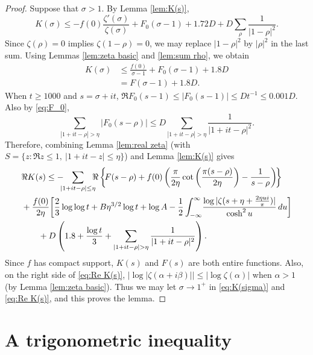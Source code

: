 \documentclass[10pt]{amsart}
\theoremstyle{remark}
\theoremstyle{plain}
\numberwithin{equation}{section}
\theoremstyle{definition}
\def\({\left(}
\def\){\right)}
\def\pfrac#1#2{\left(\frac{#1}{#2}\right)}
\def\nts{\negthickspace}
\begin{document}
\begin{proof} Suppose that $\sigma>1$.  By Lemma \ref{lem:K(s)},
$$
K(\sigma) \le -f(0) \frac{\zeta'(\sigma)}{\zeta(\sigma)} + 
F_0(\sigma-1) + 1.72D + D\sum_{\rho} \frac{1}{|1-\rho|^2}.
$$
Since $\zeta(\rho)=0$ implies $\zeta(1-\rho)=0$, we may replace $|1-\rho|^2$
by $|\rho|^2$ in the last sum.  Using Lemmas \ref{lem:zeta basic} and 
\ref{lem:sum rho}, we obtain
\begin{equation}
\begin{split}
K(\sigma) &\le \frac{f(0)}{\sigma-1} + F_0(\sigma-1)+1.8D \\
&=F(\sigma-1)+1.8D. 
\end{split}
\label{eq:K(sigma)} 
\end{equation}
When $t\ge 1000$ and $s=\sigma+it$,
$\Re F_0(s-1) \le |F_0(s-1)| \le Dt^{-1} \le 0.001 D$.
Also by \eqref{eq:F_0},
$$
\sum_{|1+it-\rho|>\eta} |F_0(s-\rho)| \le D \sum_{|1+it-\rho|>\eta}
\frac{1}{|1+it-\rho|^2}.
$$
Therefore, combining Lemma \ref{lem:real zeta} (with $S=\{ z: \Re z\le 1,\
 |1+it-z|\le \eta\}$) and Lemma \ref{lem:K(s)} gives
\begin{equation}
\begin{split}
&\Re K(s) \le  -\nts\nts \sum_{|1+it-\rho| \le \eta}\nts\nts \Re \left\{\!
   F(s-\rho) + f(0) \( \frac{\pi}{2\eta} \cot\pfrac{\pi(s-\rho)}{2\eta}
   -\frac{1}{s-\rho} \)\! \right\}  \\
&+ \frac{f(0)}{2\eta} \biggl[\frac23 \log\log t + B \eta^{3/2} \log t+\log A
  - \frac12 \int_{-\infty}^\infty \! \frac{\log|\zeta(s+\eta+\tfrac{2\eta ui}
  {\pi})|}{\cosh^2 u}\, du \biggr]  \\
&\qquad +D \( 1.8 + \frac{\log t}{3} + \sum_{|1+it-\rho| > \eta} \frac{1}
  {|1+it-\rho|^2} \).
\end{split} \label{eq:Re K(s)} 
\end{equation}
Since $f$ has compact support,  $K(s)$ and $F(s)$
are both entire functions.  Also, on the right side of \eqref{eq:Re K(s)},
$|\log| \zeta(\alpha+i\beta)|| \le |\log \zeta(\alpha)|$ when $\alpha>1$ (by
Lemma \ref{lem:zeta basic}).
 Thus we may let $\sigma \to 1^+$ in \eqref{eq:K(sigma)} and 
\eqref{eq:Re K(s)}, and this proves the lemma.
\end{proof} 


%
%
\section{A trigonometric inequality}
%
%
%
\end{document}
